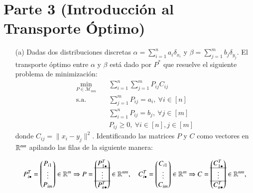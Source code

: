 \documentclass[
	spanish, %
	letterpaper, oneside
]{article}
\begin{document}
\section*{Parte 3 (Introducción al Transporte Óptimo)}
\begin{enumerate}
\item[(a)] Dadas dos distribuciones discretas \(\alpha=\sum_{i=1}^na_i\delta_{x_i}\) y \(\beta=\sum_{j=1}^mb_j\delta_{y_j}\). El transporte óptimo entre \(\alpha\) y \(\beta\) está dado por \(P^\ast\) que resuelve el siguiente problema de minimización:
\begin{equation}\tag{\(P\)}
	\begin{aligned}
			\min_{P\in\mathcal M_{nm}} \quad & \sum_{i=1}^n\sum_{j=1}^m P_{ij}C_{ij}\\
			\textrm{s.a.} \quad & \sum_{j=1}^mP_{ij} = a_i,~\forall i\in[n] \\
			& \sum_{i=1}^nP_{ij} = b_j,~\forall j\in[m]\\
			& P_{ij}\geq0,~\forall i\in[n],j\in[m]
		\end{aligned}
\end{equation}
donde \(C_{ij}=\|x_i-y_j\|^2\). Identificando las matrices \(P\) y \(C\) como vectores en \(\mathbb{R}^{nm}\) apilando las filas de la siguiente manera:

\[P_{i\bullet}^T=\begin{pmatrix}P_{i1}\\\vdots\\P_{im}\end{pmatrix}\in\mathbb{R}^m\Rightarrow P=\begin{pmatrix}
		P_{1\bullet}^T\\
		\hline
		\vdots\\
		\hline
		P_{n\bullet}^T
	\end{pmatrix}\in\mathbb{R}^{nm},\quad C_{i\bullet}^T=\begin{pmatrix}C_{i1}\\\vdots\\C_{im}\end{pmatrix}\in\mathbb{R}^m\Rightarrow C=\begin{pmatrix}
	C_{1\bullet}^T\\
	\hline
	\vdots\\
	\hline
	C_{n\bullet}^T
	\end{pmatrix}\in\mathbb{R}^{nm},\]
	

\end{enumerate}
\end{document}
